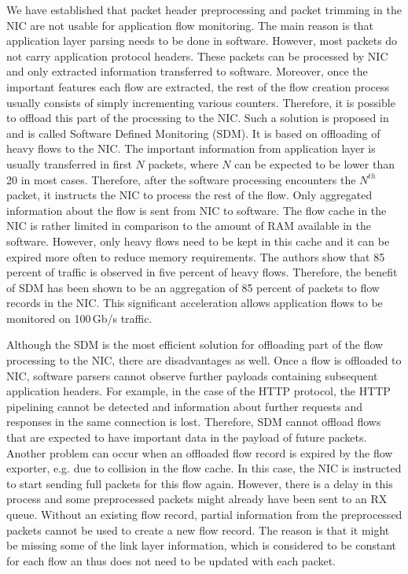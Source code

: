 We have established that packet header preprocessing and packet trimming in the NIC are not usable for application flow monitoring. The main reason is that application layer parsing needs to be done in software. However, most packets do not carry application protocol headers. These packets can be processed by NIC and only extracted information transferred to software. Moreover, once the important features each flow are extracted, the rest of the flow creation process usually consists of simply incrementing various counters. Therefore, it is possible to offload this part of the processing to the NIC. Such a solution is proposed in~\cite{Kekely-2016-Software} and is called Software Defined Monitoring (SDM). It is based on offloading of heavy flows to the NIC. The important information from application layer is usually transferred in first $N$ packets, where $N$ can be expected to be lower than 20 in most cases. Therefore, after the software processing encounters the $N^{th}$ packet, it instructs the NIC to process the rest of the flow. Only aggregated information about the flow is sent from NIC to software. The flow cache in the NIC is rather limited in comparison to the amount of RAM available in the software. However, only heavy flows need to be kept in this cache and it can be expired more often to reduce memory requirements. The authors show that 85 percent of traffic is observed in five percent of heavy flows. Therefore, the benefit of SDM has been shown to be an aggregation of 85 percent of packets to flow records in the NIC. This significant acceleration allows application flows to be monitored on 100\,Gb/s traffic.

Although the SDM is the most efficient solution for offloading part of the flow processing to the NIC, there are disadvantages as well. Once a flow is offloaded to NIC, software parsers cannot observe further payloads containing subsequent application headers. For example, in the case of the HTTP protocol, the HTTP pipelining cannot be detected and information about further requests and responses in the same connection is lost. Therefore, SDM cannot offload flows that are expected to have important data in the payload of future packets. Another problem can occur when an offloaded flow record is expired by the flow exporter, e.g. due to collision in the flow cache. In this case, the NIC is instructed to start sending full packets for this flow again. However, there is a delay in this process and some preprocessed packets might already have been sent to an RX queue. Without an existing flow record, partial information from the preprocessed packets cannot be used to create a new flow record. The reason is that it might be missing some of the link layer information, which is considered to be constant for each flow an thus does not need to be updated with each packet.

